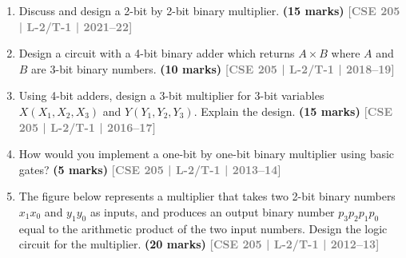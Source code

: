 \documentclass[12pt]{article}
\newcommand{\yr}[1]{\hfill\textcolor{gray}{\small\textbf{[#1]}}}
\newcommand{\mk}[1]{\textcolor{orange!70!black}{\small\textbf{(#1 marks)}}}
\begin{document}
\begin{enumerate}

\item Discuss and design a 2-bit by 2-bit binary multiplier.
\mk{15} \yr{CSE 205 | L-2/T-1 | 2021--22}



\item Design a circuit with a 4-bit binary adder which returns $A \times B$ where $A$ and $B$ are 3-bit binary numbers.
\mk{10} \yr{CSE 205 | L-2/T-1 | 2018--19}



\item Using 4-bit adders, design a 3-bit multiplier for 3-bit variables $X(X_1,X_2,X_3)$ and $Y(Y_1,Y_2,Y_3)$. Explain the design.
\mk{15} \yr{CSE 205 | L-2/T-1 | 2016--17}



\item How would you implement a one-bit by one-bit binary multiplier using basic gates?
\mk{5} \yr{CSE 205 | L-2/T-1 | 2013--14}



\item The figure below represents a multiplier that takes two 2-bit binary numbers $x_1x_0$ and $y_1y_0$ as inputs, and produces an output binary number $p_3p_2p_1p_0$ equal to the arithmetic product of the two input numbers. Design the logic circuit for the multiplier.
\mk{20} \yr{CSE 205 | L-2/T-1 | 2012--13}

\begin{center}
\end{center}



\end{enumerate}
\end{document}
